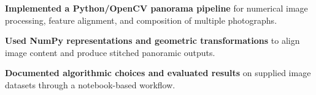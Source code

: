 \begin{bullets}
    \item \textbf{Implemented a Python/OpenCV panorama pipeline} for numerical image processing, feature alignment, and composition of multiple photographs.
    \item \textbf{Used NumPy representations and geometric transformations} to align image content and produce stitched panoramic outputs.
    \item \textbf{Documented algorithmic choices and evaluated results} on supplied image datasets through a notebook-based workflow.
\end{bullets}